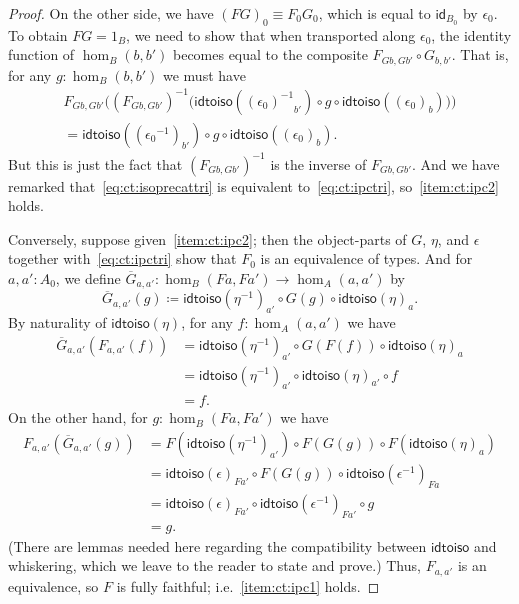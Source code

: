 \documentclass{amsart}
\newcommand{\jdeq}{\equiv}      %
\newcommand{\defeq}{\coloneqq}  %
\newcommand{\opp}[1]{\mathord{{#1}^{-1}}}
\newcommand{\idfunc}[1][]{\ensuremath{\mathsf{id}_{#1}}\xspace}
\theoremstyle{definition}
\theoremstyle{remark}
\numberwithin{equation}{section}
\newcommand{\inv}[1]{{#1}^{-1}}
\newcommand{\idtoiso}{\ensuremath{\mathsf{idtoiso}}\xspace}
\begin{document}
\begin{proof}
  On the other side, we have $(FG)_0\jdeq F_0 G_0$, which is equal to $\idfunc[B_0]$ by $\epsilon_0$.
  To obtain $FG=1_B$, we need to show that when transported along $\epsilon_0$, the identity function of $\hom_B(b,b')$ becomes equal to the composite $F_{Gb,Gb'} \circ G_{b,b'}$.
  That is, for any $g:\hom_B(b,b')$ we must have
  \begin{multline*}
    F_{Gb,Gb'}\Big(\inv{(F_{Gb,Gb'})}\Big(\idtoiso(\opp{(\epsilon_0)}_{b'}) \circ g \circ \idtoiso((\epsilon_0)_b)\Big)\Big)\\
    = \idtoiso((\opp{\epsilon_0})_{b'}) \circ g \circ \idtoiso((\epsilon_0)_b).
  \end{multline*}
  But this is just the fact that $\inv{(F_{Gb,Gb'})}$ is the inverse of $F_{Gb,Gb'}$.
  And we have remarked that~\eqref{eq:ct:isoprecattri} is equivalent to~\eqref{eq:ct:ipctri}, so~\ref{item:ct:ipc2} holds.

  Conversely, suppose given~\ref{item:ct:ipc2}; then the object-parts of $G$, $\eta$, and $\epsilon$ together with~\eqref{eq:ct:ipctri} show that $F_0$ is an equivalence of types.
  And for $a,a':A_0$, we define $\overline{G}_{a,a'}: \hom_B(Fa,Fa') \to \hom_A(a,a')$ by
  \begin{equation}
    \overline{G}_{a,a'}(g) \defeq \idtoiso(\opp{\eta})_{a'} \circ G(g) \circ \idtoiso(\eta)_a.\label{eq:ct:gbar}
  \end{equation}
  By naturality of $\idtoiso(\eta)$, for any $f:\hom_A(a,a')$ we have
  \begin{align*}
    \overline{G}_{a,a'}(F_{a,a'}(f))
    &= \idtoiso(\opp{\eta})_{a'} \circ G(F(f)) \circ \idtoiso(\eta)_a\\
    &= \idtoiso(\opp{\eta})_{a'} \circ \idtoiso(\eta)_{a'} \circ f \\
    &= f.
  \end{align*}
  On the other hand, for $g:\hom_B(Fa,Fa')$ we have
  \begin{align*}
    F_{a,a'}(\overline{G}_{a,a'}(g))
    &= F(\idtoiso(\opp{\eta})_{a'}) \circ F(G(g)) \circ F(\idtoiso(\eta)_a)\\
    &= \idtoiso(\epsilon)_{Fa'}
    \circ F(G(g))
    \circ \idtoiso(\opp{\epsilon})_{Fa}\\
    &= \idtoiso(\epsilon)_{Fa'}
    \circ \idtoiso(\opp{\epsilon})_{Fa'}
    \circ g\\
    &= g.
  \end{align*}
  (There are lemmas needed here regarding the compatibility between \idtoiso and whiskering, which we leave to the reader to state and prove.)
  Thus, $F_{a,a'}$ is an equivalence, so $F$ is fully faithful; i.e.~\ref{item:ct:ipc1} holds.


\end{proof}
\end{document}
